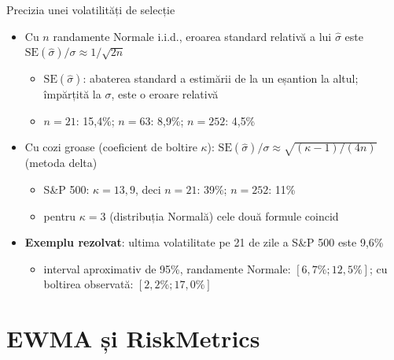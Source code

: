 \begin{frame}{Precizia unei volatilități de selecție}
\itemsize{\small}
\begin{itemize}
    \item Cu $n$ randamente Normale i.i.d., eroarea standard relativă a lui $\hat\sigma$ este $\mathrm{SE}(\hat\sigma)/\sigma \approx 1/\sqrt{2n}$
    \begin{itemize}
        \item $\mathrm{SE}(\hat\sigma)$: abaterea standard a estimării de la un eșantion la altul; împărțită la $\sigma$, este o eroare relativă
        \item $n = 21$: 15{,}4\%; $n = 63$: 8{,}9\%; $n = 252$: 4{,}5\%
    \end{itemize}
    \item Cu cozi groase (coeficient de boltire $\kappa$): $\mathrm{SE}(\hat\sigma)/\sigma \approx \sqrt{(\kappa - 1)/(4n)}$ (metoda delta)
    \begin{itemize}
        \item S\&P 500: $\kappa = 13{,}9$, deci $n = 21$: 39\%; $n = 252$: 11\%
        \item pentru $\kappa = 3$ (distribuția Normală) cele două formule coincid
    \end{itemize}
    \item \textbf{Exemplu rezolvat}: ultima volatilitate pe 21 de zile a S\&P 500 este 9{,}6\%
    \begin{itemize}
        \item interval aproximativ de 95\%, randamente Normale: $[6{,}7\%; 12{,}5\%]$; cu boltirea observată: $[2{,}2\%; 17{,}0\%]$
    \end{itemize}
\end{itemize}
\end{frame}


\section{EWMA și RiskMetrics}

